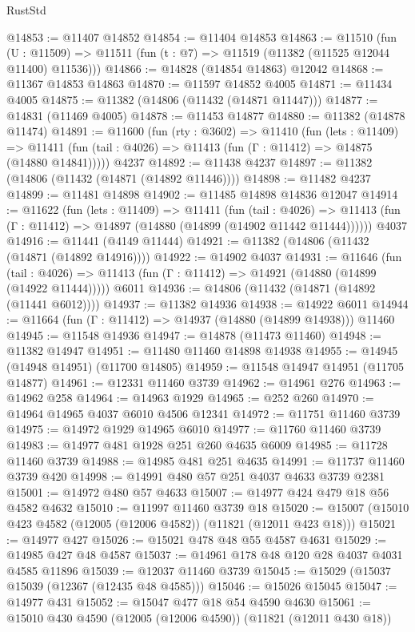 \begin{lexlean}{RustStd}
\begin{coremodule}
@14853 := @11407 @14852
@14854 := @11404 @14853
@14863 := @11510
    (fun (U : @11509) => @11511 (fun (t : @7) => @11519 (@11382 (@11525 @12044 @11400) @11536)))
@14866 := @14828 (@14854 @14863) @12042
@14868 := @11367 @14853 @14863
@14870 := @11597 @14852 @4005
@14871 := @11434 @4005
@14875 := @11382 (@14806 (@11432 (@14871 @11447)))
@14877 := @14831 (@11469 @4005)
@14878 := @11453 @14877
@14880 := @11382 (@14878 @11474)
@14891 := @11600
    (fun (rty : @3602) =>
    @11410
      (fun (lets : @11409) =>
      @11411 (fun (tail : @4026) => @11413 (fun (Γ : @11412) => @14875 (@14880 @14841)))))
    @4237
@14892 := @11438 @4237
@14897 := @11382 (@14806 (@11432 (@14871 (@14892 @11446))))
@14898 := @11482 @4237
@14899 := @11481 @14898
@14902 := @11485 @14898 @14836 @12047
@14914 := @11622
    (fun (lets : @11409) =>
    @11411
      (fun (tail : @4026) =>
      @11413 (fun (Γ : @11412) => @14897 (@14880 (@14899 (@14902 @11442 @11444))))))
    @4037
@14916 := @11441 (@4149 @11444)
@14921 := @11382 (@14806 (@11432 (@14871 (@14892 @14916))))
@14922 := @14902 @4037
@14931 := @11646
    (fun (tail : @4026) => @11413 (fun (Γ : @11412) => @14921 (@14880 (@14899 (@14922 @11444)))))
    @6011
@14936 := @14806 (@11432 (@14871 (@14892 (@11441 @6012))))
@14937 := @11382 @14936
@14938 := @14922 @6011
@14944 := @11664 (fun (Γ : @11412) => @14937 (@14880 (@14899 @14938))) @11460
@14945 := @11548 @14936
@14947 := @14878 (@11473 @11460)
@14948 := @11382 @14947
@14951 := @11480 @11460 @14898 @14938
@14955 := @14945 (@14948 @14951) (@11700 @14805)
@14959 := @11548 @14947 @14951 (@11705 @14877)
@14961 := @12331 @11460 @3739
@14962 := @14961 @276
@14963 := @14962 @258
@14964 := @14963 @1929
@14965 := @252 @260
@14970 := @14964 @14965 @4037 @6010 @4506 @12341
@14972 := @11751 @11460 @3739
@14975 := @14972 @1929 @14965 @6010
@14977 := @11760 @11460 @3739
@14983 := @14977 @481 @1928 @251 @260 @4635 @6009
@14985 := @11728 @11460 @3739
@14988 := @14985 @481 @251 @4635
@14991 := @11737 @11460 @3739 @420
@14998 := @14991 @480 @57 @251 @4037 @4633 @3739 @2381
@15001 := @14972 @480 @57 @4633
@15007 := @14977 @424 @479 @18 @56 @4582 @4632
@15010 := @11997 @11460 @3739 @18
@15020 := @15007 (@15010 @423 @4582 (@12005 (@12006 @4582)) (@11821 (@12011 @423 @18)))
@15021 := @14977 @427
@15026 := @15021 @478 @48 @55 @4587 @4631
@15029 := @14985 @427 @48 @4587
@15037 := @14961 @178 @48 @120 @28 @4037 @4031 @4585 @11896
@15039 := @12037 @11460 @3739
@15045 := @15029 (@15037 @15039 (@12367 (@12435 @48 @4585)))
@15046 := @15026 @15045
@15047 := @14977 @431
@15052 := @15047 @477 @18 @54 @4590 @4630
@15061 := @15010 @430 @4590 (@12005 (@12006 @4590)) (@11821 (@12011 @430 @18))

\end{coremodule}
\end{lexlean}
